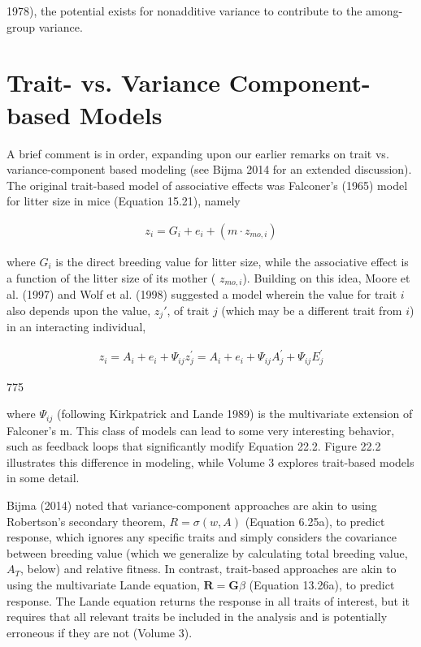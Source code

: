 \documentclass{article}
\begin{document}
1978), the potential exists for nonadditive variance to contribute to the among-group variance.

\section{Trait- vs. Variance Component-based Models}
A brief comment is in order, expanding upon our earlier remarks on trait vs. variance-component based modeling (see Bijma 2014 for an extended discussion). The original trait-based model of associative effects was Falconer's (1965) model for litter size in mice (Equation 15.21), namely

\begin{equation}
\begin{align*}z_i=G_i+e_i+(m\cdot z_{mo,i})\end{align*}
\end{equation}

where  $ G_i $ is the direct breeding value for litter size, while the associative effect is a function of the litter size of its mother ( $ z_{mo,i} $). Building on this idea, Moore et al. (1997) and Wolf et al. (1998) suggested a model wherein the value for trait  $ i $ also depends upon the value,  $ z_j' $, of trait  $ j $ (which may be a different trait from  $ i $) in an interacting individual,

\begin{equation}
\begin{align*}z_i=A_i+e_i+\Psi_{ij}z^{\prime}_j=A_i+e_i+\Psi_{ij}A^{\prime}_j+\Psi_{ij}E^{\prime}_j\end{align*}
\tag{22.2}
\label{eq:22_2}
\end{equation}

775

where  $ \Psi_{ij} $ (following Kirkpatrick and Lande 1989) is the multivariate extension of Falconer's m. This class of models can lead to some very interesting behavior, such as feedback loops that significantly modify Equation 22.2. Figure 22.2 illustrates this difference in modeling, while Volume 3 explores trait-based models in some detail.

Bijma (2014) noted that variance-component approaches are akin to using Robertson’s secondary theorem,  $ R = \sigma(w, A) $ (Equation 6.25a), to predict response, which ignores any specific traits and simply considers the covariance between breeding value (which we generalize by calculating total breeding value,  $ A_T $, below) and relative fitness. In contrast, trait-based approaches are akin to using the multivariate Lande equation,  $ \mathbf{R} = \mathbf{G}\beta $ (Equation 13.26a), to predict response. The Lande equation returns the response in all traits of interest, but it requires that all relevant traits be included in the analysis and is potentially erroneous if they are not (Volume 3).
\end{document}
